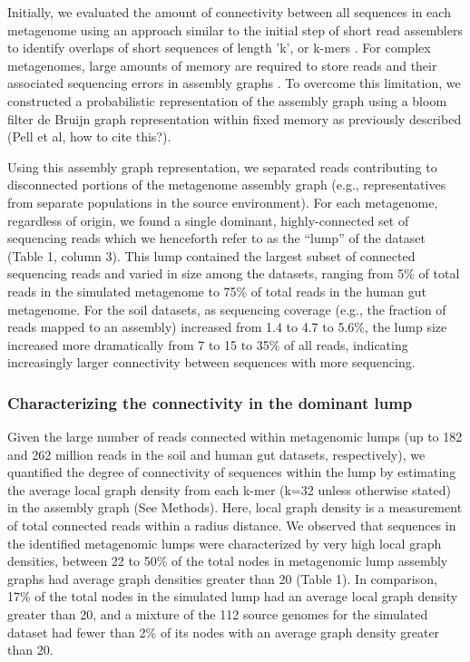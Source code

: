 \documentclass[10pt]{article}
\begin{document}
Initially, we evaluated the amount of connectivity between all sequences in each metagenome using an approach similar to the initial step of short read assemblers to identify overlaps of short sequences of length 'k', or k-mers \cite{Peng:2011p898,Simpson:2009p233,Zerbino:2008p665}.  For complex metagenomes, large amounts of memory are required to store reads and their associated sequencing errors in assembly graphs \cite{Hess:2011p686,Mackelprang:2011p1087,Qin:2010p189}.  To overcome this limitation, we constructed a probabilistic representation of the assembly graph using a bloom filter de Bruijn graph representation within fixed memory as previously described (Pell et al, how to cite this?).  

Using this assembly graph representation, we separated reads contributing to disconnected portions of the metagenome assembly graph (e.g., representatives from separate populations in the source environment).  For each metagenome, regardless of origin, we found a single dominant, highly-connected set of sequencing reads which we henceforth refer to as the  ``lump''  of the dataset (Table 1, column 3).  This lump contained the largest subset of connected sequencing reads and varied in size among the datasets, ranging from 5\% of total reads in the simulated metagenome to 75\% of total reads in the human gut metagenome.  For the soil datasets, as sequencing coverage (e.g., the fraction of reads mapped to an assembly) increased from 1.4 to 4.7 to 5.6\%, the lump size increased more dramatically from 7 to 15 to 35\% of all reads, indicating increasingly larger connectivity between sequences with more sequencing.

\subsubsection*{Characterizing the connectivity in the dominant lump}

Given the large number of reads connected within metagenomic lumps (up to 182 and 262 million reads in the soil and human gut datasets, respectively), we quantified the degree of connectivity of sequences within the lump by estimating the average local graph density from each k-mer (k=32 unless otherwise stated) in the assembly graph (See Methods).  Here, local graph density is a measurement of total connected reads within a radius distance.  We observed that sequences in the identified metagenomic lumps were characterized by very high local graph densities, between 22 to 50\% of the total nodes in metagenomic lump assembly graphs had average graph densities greater than 20 (Table 1).  In comparison, 17\% of the total nodes in the simulated lump had an average local graph density greater than 20, and a mixture of the 112 source genomes for the simulated dataset had fewer than 2\% of its nodes with an average graph density greater than 20.  
\end{document}
